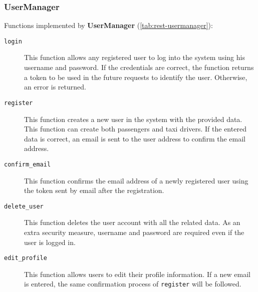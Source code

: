\subsubsection{UserManager}
Functions implemented by \textbf{UserManager} (\autoref{tab:rest-usermanager}):
\begin{description}
    \item[\texttt{login}] This function allows any registered user to log into the system using his username and password. If the credentials are correct, the function returns a token to be used in the future requests to identify the user. Otherwise, an error is returned.

    \item[\texttt{register}] This function creates a new user in the system with the provided data. This function can create both passengers and taxi drivers. If the entered data is correct, an email is sent to the user address to confirm the email address.

    \item[\texttt{confirm\_email}] This function confirms the email address of a newly registered user using the token sent by email after the registration.

    \item[\texttt{delete\_user}] This function deletes the user account with all the related data. As an extra security measure, username and password are required even if the user is logged in.

    \item[\texttt{edit\_profile}] This function allows users to edit their profile information. If a new email is entered, the same confirmation process of \texttt{register} will be followed.
\end{description}

